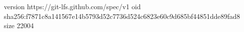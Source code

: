 version https://git-lfs.github.com/spec/v1
oid sha256:f7871c8a141567e14b5793d52c7736d524c6823e60c9d685bf44851dde89fad8
size 22004
